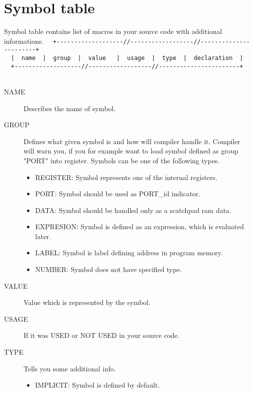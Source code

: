         \section{Symbol table}
            Symbol table contains list of macros in your source code with additional informations.
            {
                \usecodefont
                \verb'  +-------------------//------------------//-----------------------+'\\
                \verb'  |  name  |  group  |  value   |  usage  |  type  |  declaration  |'\\
                \verb'  +-------------------//------------------//-----------------------+'\\
            }\\
            \begin{description}
             \item[NAME] Describes the name of symbol.
             \item[GROUP] Defines what given symbol is and how will compiler handle it. Compiler will warn you, if you for example want to load symbol
             defined as group "PORT" into register. Symbols can be one of the following types.
                \begin{itemize}
                 \item REGISTER: Symbol represents one of the internal registers.
                 \item PORT: Symbol should be used as PORT\_id indicator.
                 \item DATA: Symbol should be handled only as a scatch\-pad ram data.
                 \item EXPRESION: Symbol is defined as an expression, which is evaluated later.
                 \item LABEL: Symbol is label defining address in program memory.
                 \item NUMBER: Symbol does not have specified type.
                \end{itemize}
             \item[VALUE] Value which is represented by the symbol.
             \item[USAGE] If it was USED or NOT USED in your source code.
             \item[TYPE] Tells you some additional info.
                \begin{itemize}
                 \item IMPLICIT: Symbol is defined by default.

\end{itemize}
\end{description}
